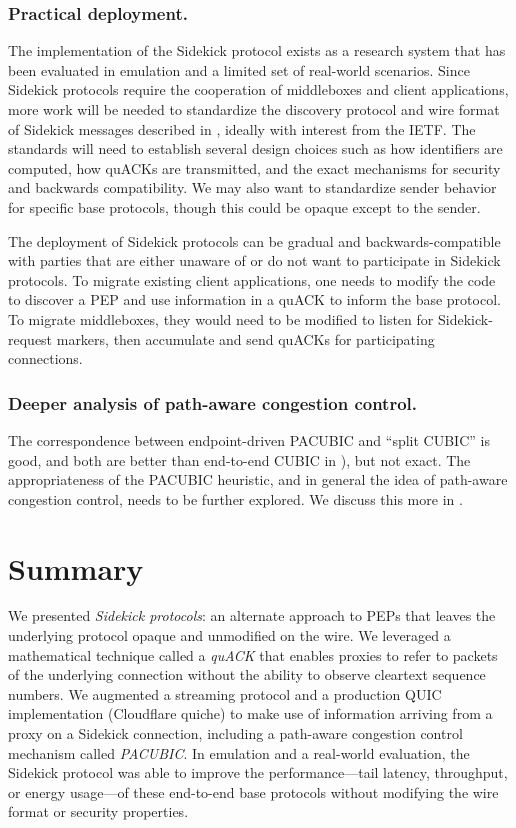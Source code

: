 \subsubsection{Practical deployment.}

The implementation of the Sidekick protocol exists as a research system that has
been evaluated in emulation and a limited set of real-world scenarios. Since
Sidekick protocols require the cooperation of middleboxes and client
applications, more work will be needed to standardize the discovery protocol
and wire format of Sidekick messages described in
, ideally with interest from the IETF. The
standards will need to establish several design choices such as how identifiers
are computed, how quACKs are transmitted, and the exact mechanisms for security
and backwards compatibility. We may also want to standardize sender behavior
for specific base protocols, though this could be opaque except to the sender.

The deployment of Sidekick protocols can be gradual and backwards-compatible
with parties that are either unaware of or do not want to participate in
Sidekick protocols.
To migrate existing client applications, one needs to modify the code to
discover a PEP and use information in a quACK to inform the base protocol.
To migrate middleboxes, they would need to be modified to listen for
Sidekick-request markers, then accumulate and send quACKs for participating
connections.

\subsubsection{Deeper analysis of path-aware congestion control.}

The correspondence between endpoint-driven PACUBIC and ``split CUBIC'' is good,
and both are better than end-to-end CUBIC in ),
but not exact. The appropriateness of the PACUBIC heuristic, and in general the
idea of path-aware congestion control, needs to be further explored. We discuss
this more in .

\section{Summary}
\label{sec:sidekick:summary}

We presented \textit{Sidekick protocols}: an alternate approach to PEPs that
leaves the underlying protocol opaque and unmodified on the wire. We leveraged
a mathematical technique called a \textit{quACK} that enables proxies to refer
to packets of the underlying connection without the ability to observe
cleartext sequence numbers. We augmented a streaming protocol and a production
QUIC implementation (Cloudflare quiche) to make use of information arriving
from a proxy on a Sidekick connection, including a path-aware congestion control
mechanism called \textit{PACUBIC}. In emulation and a real-world evaluation,
the Sidekick protocol was able to improve the performance---tail latency,
throughput, or energy usage---of these end-to-end base protocols without
modifying the wire format or security properties.
